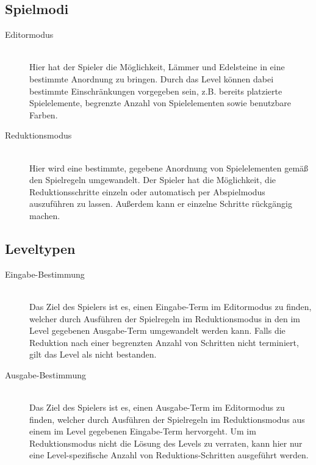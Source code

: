 \subsection{Spielmodi}

\begin{description}
\item[Editormodus] \hfill \\ Hier hat der Spieler die Möglichkeit, Lämmer und Edelsteine in eine bestimmte Anordnung zu bringen. Durch das Level können dabei bestimmte Einschränkungen vorgegeben sein, z.B. bereits platzierte Spielelemente, begrenzte Anzahl von Spielelementen sowie benutzbare Farben.
\item[Reduktionsmodus] \hfill \\ Hier wird eine bestimmte, gegebene Anordnung von Spielelementen gemäß den Spielregeln umgewandelt. Der Spieler hat die Möglichkeit, die Reduktionsschritte einzeln oder automatisch per Abspielmodus auszuführen zu lassen. Außerdem kann er einzelne Schritte rückgängig machen.
\end{description}

\subsection{Leveltypen}

\begin{description}
\item[Eingabe-Bestimmung] \hfill \\ Das Ziel des Spielers ist es, einen Eingabe-Term im Editormodus zu finden, welcher durch Ausführen  der Spielregeln im Reduktionsmodus in den im Level gegebenen Ausgabe-Term umgewandelt werden kann. Falls die Reduktion nach einer begrenzten Anzahl von Schritten nicht terminiert, gilt das Level als nicht bestanden.
\item[Ausgabe-Bestimmung] \hfill \\ Das Ziel des Spielers ist es, einen Ausgabe-Term im Editormodus zu finden, welcher durch Ausführen  der Spielregeln im Reduktionsmodus aus einem im Level gegebenen Eingabe-Term hervorgeht. Um im Reduktionsmodus nicht die Lösung des Levels zu verraten, kann hier nur eine Level-spezifische Anzahl von Reduktions-Schritten ausgeführt werden.
\end{description}
